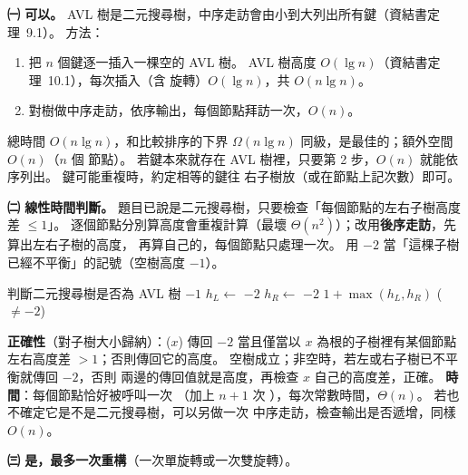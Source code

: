 \begin{pastsoln}
\textbf{㈠ 可以。} AVL 樹是二元搜尋樹，中序走訪會由小到大列出所有鍵（資結書定理~9.1）。 方法：
\begin{enumerate}[nosep]
\item 把 $n$ 個鍵逐一插入一棵空的 AVL 樹。 AVL 樹高度 $O(\lg n)$（資結書定理~10.1），每次插入（含
旋轉）$O(\lg n)$，共 $O(n \lg n)$。
\item 對樹做中序走訪，依序輸出，每個節點拜訪一次，$O(n)$。
\end{enumerate}
總時間 $O(n \lg n)$，和比較排序的下界 $\Omega(n \lg n)$ 同級，是最佳的；額外空間 $O(n)$（$n$ 個
節點）。 若鍵本來就存在 AVL 樹裡，只要第 2 步，$O(n)$ 就能依序列出。 鍵可能重複時，約定相等的鍵往
右子樹放（或在節點上記次數）即可。

\textbf{㈡ 線性時間判斷。} 題目已說是二元搜尋樹，只要檢查「每個節點的左右子樹高度差 $\le 1$」。
逐個節點分別算高度會重複計算（最壞 $\Theta(n^2)$）；改用\textbf{後序走訪}，先算出左右子樹的高度，
再算自己的，每個節點只處理一次。 用 $-2$ 當「這棵子樹已經不平衡」的記號（空樹高度 $-1$）。
\begin{pseudo}{判斷二元搜尋樹是否為 AVL 樹}
 
        \State \Return $-1$
    \EndIf
    \State $h_L \gets$ 
        \State \Return $-2$
    \EndIf
    \State $h_R \gets$ 
        \State \Return $-2$
    \EndIf
    \State \Return $1 + \max(h_L, h_R)$
\EndFunction
{}
    \State \Return ( $\ne -2$)
\EndFunction
\end{pseudo}
\textbf{正確性}（對子樹大小歸納）：($x$) 傳回 $-2$ 當且僅當以 $x$ 為根的子樹裡有某個節點
左右高度差 $> 1$；否則傳回它的高度。 空樹成立；非空時，若左或右子樹已不平衡就傳回 $-2$，否則
兩邊的傳回值就是高度，再檢查 $x$ 自己的高度差，正確。 \textbf{時間}：每個節點恰好被呼叫一次
（加上 $n + 1$ 次 \NIL），每次常數時間，$\Theta(n)$。 若也不確定它是不是二元搜尋樹，可以另做一次
中序走訪，檢查輸出是否遞增，同樣 $O(n)$。

\textbf{㈢ 是，最多一次重構}（一次單旋轉或一次雙旋轉）。


\end{pastsoln}

